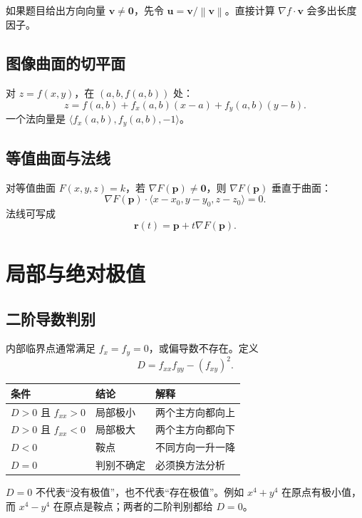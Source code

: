 \documentclass[UTF8,a4paper,10pt,fontset=fandol]{ctexart}
\newcommand{\norm}[1]{\left\lVert #1\right\rVert}
\newcommand{\vect}[1]{\mathbf{#1}}
\begin{document}
\begin{condition}[方向必须归一化]
如果题目给出方向向量 $\vect v\ne\vect0$，先令 $\vect u=\vect v/\norm{\vect v}$。直接计算 $\nabla f\cdot\vect v$ 会多出长度因子。
\end{condition}

\subsection{图像曲面的切平面}

对 $z=f(x,y)$，在 $(a,b,f(a,b))$ 处：
\[
z=f(a,b)+f_x(a,b)(x-a)+f_y(a,b)(y-b).
\]
一个法向量是 $\langle f_x(a,b),f_y(a,b),-1\rangle$。

\subsection{等值曲面与法线}

对等值曲面 $F(x,y,z)=k$，若 $\nabla F(\vect p)\ne\vect0$，则 $\nabla F(\vect p)$ 垂直于曲面：
\[
\nabla F(\vect p)\cdot\langle x-x_0,y-y_0,z-z_0\rangle=0.
\]
法线可写成
\[
\vect r(t)=\vect p+t\nabla F(\vect p).
\]

\section{局部与绝对极值}

\subsection{二阶导数判别}

内部临界点通常满足 $f_x=f_y=0$，或偏导数不存在。定义
\[
D=f_{xx}f_{yy}-(f_{xy})^2.
\]

\begin{center}
\begin{tabular}{lll}
\toprule
条件 & 结论 & 解释 \\
\midrule
$D>0$ 且 $f_{xx}>0$ & 局部极小 & 两个主方向都向上 \\
$D>0$ 且 $f_{xx}<0$ & 局部极大 & 两个主方向都向下 \\
$D<0$ & 鞍点 & 不同方向一升一降 \\
$D=0$ & 判别不确定 & 必须换方法分析 \\
\bottomrule
\end{tabular}
\end{center}

\begin{warning}[不要漏掉 $D=0$]
$D=0$ 不代表“没有极值”，也不代表“存在极值”。例如 $x^4+y^4$ 在原点有极小值，而 $x^4-y^4$ 在原点是鞍点；两者的二阶判别都给 $D=0$。
\end{warning}
\end{document}
